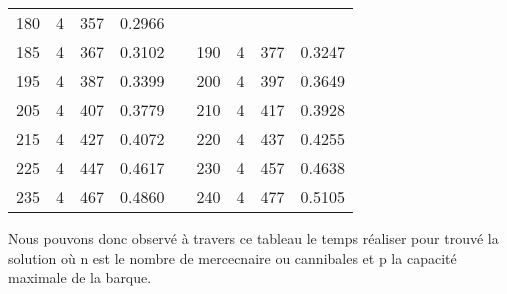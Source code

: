 \documentclass[a4paper, 12pt, french,oneside]{book}
\begin{document}
\begin{table}[!ht]
\begin{tabularx}{\linewidth}{|c|c|c|c|X|c|c|c|c|}
        180          & 4            & 357             & 0.2966                                                                                                           \\

        185          & 4            & 367             & 0.3102                        &  &

        190          & 4            & 377             & 0.3247                                                                                                           \\

        195          & 4            & 387             & 0.3399                        &  &

        200          & 4            & 397             & 0.3649                                                                                                           \\

        205          & 4            & 407             & 0.3779                        &  &

        210          & 4            & 417             & 0.3928                                                                                                           \\

        215          & 4            & 427             & 0.4072                        &  &

        220          & 4            & 437             & 0.4255                                                                                                           \\

        225          & 4            & 447             & 0.4617                        &  &

        230          & 4            & 457             & 0.4638                                                                                                           \\

        235          & 4            & 467             & 0.4860                        &  &

        240          & 4            & 477             & 0.5105                                                                                                           \\
        \cline{1-4}\cline{6-9}
    \end{tabularx}
\end{table}
Nous pouvons donc observé à travers ce tableau le temps réaliser pour trouvé la solution où n est le nombre de mercecnaire ou cannibales et p la capacité maximale de la barque.
\end{document}
